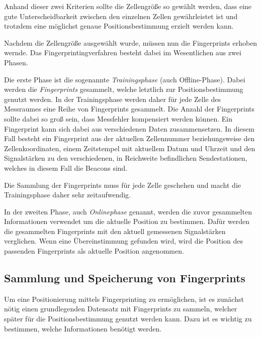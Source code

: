 Anhand dieser zwei Kriterien sollte die Zellengröße so gewählt werden, dass eine gute Unterscheidbarkeit zwischen den einzelnen Zellen gewährleistet ist und trotzdem eine möglichst genaue Positionsbestimmung erzielt werden kann.


Nachdem die Zellengröße ausgewählt wurde, müssen nun die Fingerprints erhoben wernde.
Das Fingerprintingverfahren besteht dabei im Wesentlichen aus zwei Phasen.

Die erste Phase ist die sogenannte \emph{Trainingsphase} (auch Offline-Phase). Dabei werden die \emph{Fingerprints} gesammelt, welche letztlich zur Positionsbestimmung genutzt werden. 
In der Trainingsphase werden daher für jede Zelle des Messraumes eine Reihe von Fingerprints gesammelt. Die Anzahl der Fingerprints sollte dabei so groß sein, dass Messfehler kompensiert werden können. 
Ein Fingerprint kann sich dabei aus verschiedenen Daten zusammensetzen. 
In diesem Fall besteht ein Fingerprint aus der aktuellen Zellennummer beziehungsweise den Zellenkoordinaten, einem Zeitstempel mit aktuellem Datum und Uhrzeit und den Signalstärken zu den verschiedenen, in Reichweite befindlichen Sendestationen, welches in diesem Fall die Beacons sind.

Die Sammlung der Fingerprints muss für jede Zelle geschehen und macht die Trainingsphase daher sehr zeitaufwendig. 

In der zweiten Phase, auch \emph{Onlinephase} genannt, werden die zuvor gesammelten Informationen verwendet um die aktuelle Position zu bestimmen. 
Dafür werden die gesammelten Fingerprints mit den aktuell gemessenen Signalstärken verglichen. Wenn eine Übereinstimmung gefunden wird, wird die Position des passenden Fingerprints als aktuelle Position angenommen.


\subsection{Sammlung und Speicherung von Fingerprints}
\label{sec:implementation:fingerprinting:collecting}
Um eine Positionierung mittels Fingerprinting zu ermöglichen, ist es zunächst nötig einen grundlegenden Datensatz mit Fingerprints zu sammeln, welcher später für die Positionsbestimmung genutzt werden kann. Dazu ist es wichtig zu bestimmen, welche Informationen benötigt werden.

